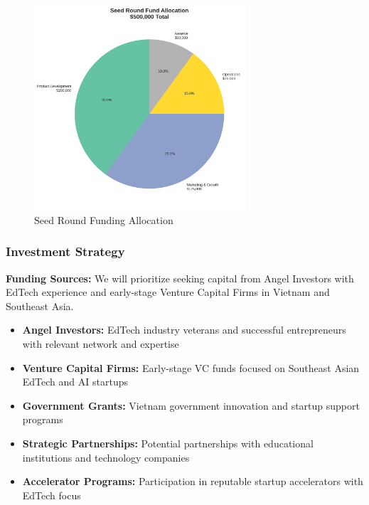\begin{figure}[h]
\centering
\includegraphics[width=0.7\textwidth]{graphics/funding_allocation.png}
\caption{Seed Round Funding Allocation}
\label{fig:funding_allocation}
\end{figure}

\subsubsection{Investment Strategy}
\textbf{Funding Sources:}
We will prioritize seeking capital from Angel Investors with EdTech experience and early-stage Venture Capital Firms in Vietnam and Southeast Asia.

\begin{itemize}
    \item \textbf{Angel Investors:} EdTech industry veterans and successful entrepreneurs with relevant network and expertise
    \item \textbf{Venture Capital Firms:} Early-stage VC funds focused on Southeast Asian EdTech and AI startups
    \item \textbf{Government Grants:} Vietnam government innovation and startup support programs
    \item \textbf{Strategic Partnerships:} Potential partnerships with educational institutions and technology companies
    \item \textbf{Accelerator Programs:} Participation in reputable startup accelerators with EdTech focus
\end{itemize}

